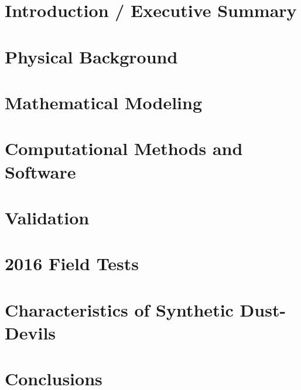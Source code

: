 \documentclass[draft,tgtermes,12pt]{report}    %
\theoremstyle{definition}
\theoremstyle{remark}
\begin{document}
%
%
\chapter{Introduction / Executive Summary}


\chapter{Physical Background}


\chapter{Mathematical Modeling}


\chapter{Computational Methods and Software}


\chapter{Validation}


\chapter{2016 Field Tests}


\chapter{Characteristics of Synthetic Dust-Devils}


\chapter{Conclusions}

\end{document}
